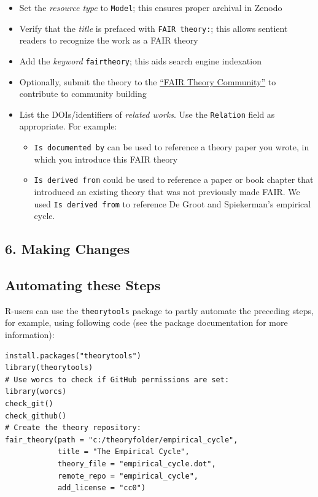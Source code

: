 \documentclass[
  man,floatsintext]{apa6}
\providecommand{\tightlist}{%
  \setlength{\itemsep}{0pt}\setlength{\parskip}{0pt}}
\begin{document}
\begin{itemize}
\tightlist
\item
  Set the \emph{resource type} to \texttt{Model}; this ensures proper archival in Zenodo
\item
  Verify that the \emph{title} is prefaced with \texttt{FAIR\ theory:}; this allows sentient readers to recognize the work as a FAIR theory
\item
  Add the \emph{keyword} \texttt{fairtheory}; this aids search engine indexation
\item
  Optionally, submit the theory to the \href{https://zenodo.org/communities/fairtheory}{``FAIR Theory Community''} to contribute to community building
\item
  List the DOIs/identifiers of \emph{related works}. Use the \texttt{Relation} field as appropriate. For example:

  \begin{itemize}
  \tightlist
  \item
    \texttt{Is\ documented\ by} can be used to reference a theory paper you wrote, in which you introduce this FAIR theory
  \item
    \texttt{Is\ derived\ from} could be used to reference a paper or book chapter that introduced an existing theory that was not previously made FAIR. We used \texttt{Is\ derived\ from} to reference De Groot and Spiekerman's empirical cycle.
  \end{itemize}
\end{itemize}

\subsection{6. Making Changes}\label{making-changes}

\subsection{Automating these Steps}\label{automating-these-steps}

R-users can use the \texttt{theorytools} package to partly automate the preceding steps, for example, using following code (see the package documentation for more information):

\begin{verbatim}
install.packages("theorytools")
library(theorytools)
# Use worcs to check if GitHub permissions are set:
library(worcs)
check_git()
check_github()
# Create the theory repository:
fair_theory(path = "c:/theoryfolder/empirical_cycle",
            title = "The Empirical Cycle",
            theory_file = "empirical_cycle.dot",
            remote_repo = "empirical_cycle",
            add_license = "cc0")
\end{verbatim}
\end{document}
